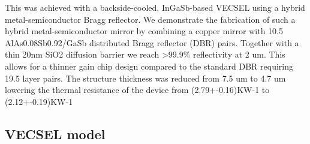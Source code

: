 This was achieved with a backside-cooled, InGaSb-based VECSEL using a hybrid metal-semiconductor Bragg reflector. We demonstrate the fabrication of such a hybrid metal-semiconductor mirror by combining a copper mirror with 10.5 AlAs0.08Sb0.92/GaSb distributed Bragg reflector (DBR) pairs. Together with a thin 20nm SiO2 diffusion barrier we reach >99.9\% reflectivity at 2 um. This allows for a thinner gain chip design compared to the standard DBR requiring 19.5 layer pairs. The structure thickness was reduced from 7.5 um to 4.7 um lowering the thermal resistance of the device from (2.79+-0.16)KW-1 to (2.12+-0.19)KW-1



\subsection{VECSEL model}